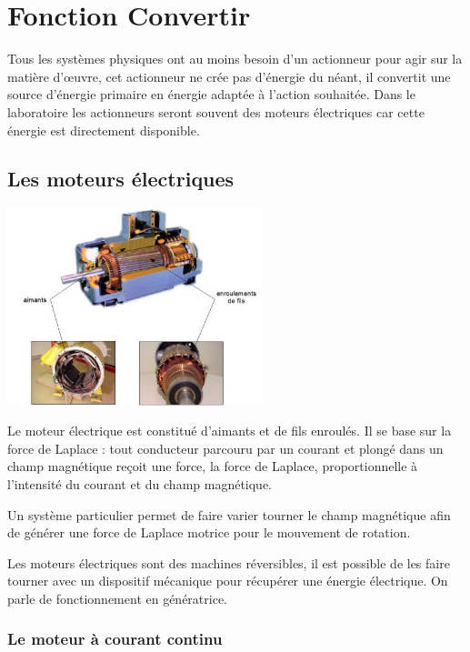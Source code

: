 \section{Fonction Convertir}

Tous les systèmes physiques ont au moins besoin d'un actionneur pour
agir sur la matière d'œuvre, cet actionneur ne crée pas d'énergie du
néant, il convertit une source d'énergie primaire en énergie adaptée à
l'action souhaitée. Dans le laboratoire les actionneurs seront souvent
des moteurs électriques car cette énergie est directement disponible.



\subsection{Les moteurs électriques}

\begin{center}
\includegraphics[width=2.91947in,height=2.25279in]{media/image70.jpeg} 
\end{center}

Le moteur électrique est constitué d'aimants et de fils enroulés. Il se
base sur la force de Laplace : tout conducteur parcouru par un courant
et plongé dans un champ magnétique reçoit une force, la force de
Laplace, proportionnelle à l'intensité du courant et du champ
magnétique.

Un système particulier permet de faire varier tourner le champ
magnétique afin de générer une force de Laplace motrice pour le
mouvement de rotation.

Les moteurs électriques sont des machines réversibles, il est possible
de les faire tourner avec un dispositif mécanique pour récupérer une
énergie électrique. On parle de fonctionnement en génératrice. \\

\subsubsection{Le moteur à courant continu}

